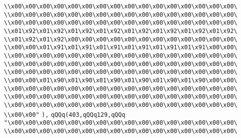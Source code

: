 \verb|\\x00\x00\x00\x00\x00\x00\x00\x00\x00\x00\x00\x00\x00\x00\x00\x00\|\newline
\verb|\\x00\x00\x00\x00\x00\x00\x00\x00\x00\x00\x00\x00\x00\x00\x00\x00\|\newline
\verb|\\x00\x00\x00\x00\x00\x00\x00\x00\x00\x00\x00\x00\x00\x00\x00\x00\|\newline
\verb|\\x01\x92\x01\x92\x01\x92\x01\x92\x01\x92\x01\x92\x01\x92\x01\x92\|\newline
\verb|\\x01\x92\x01\x92\x00\x00\x00\x00\x00\x00\x00\x00\x00\x00\x00\x00\|\newline
\verb|\\x00\x00\x01\x91\x01\x91\x01\x91\x01\x91\x01\x91\x01\x91\x00\x00\|\newline
\verb|\\x00\x00\x00\x00\x00\x00\x00\x00\x00\x00\x00\x00\x00\x00\x00\x00\|\newline
\verb|\\x00\x00\x00\x00\x00\x00\x00\x00\x00\x00\x00\x00\x00\x00\x00\x00\|\newline
\verb|\\x00\x00\x00\x00\x00\x00\x00\x00\x00\x00\x00\x00\x00\x00\x00\x00\|\newline
\verb|\\x00\x00\x01\x90\x01\x90\x01\x90\x01\x90\x01\x90\x01\x90\x00\x00\|\newline
\verb|\\x00\x00\x00\x00\x00\x00\x00\x00\x00\x00\x00\x00\x00\x00\x00\x00\|\newline
\verb|\\x00\x00\x00\x00\x00\x00\x00\x00\x00\x00\x00\x00\x00\x00\x00\x00\|\newline
\verb|\\x00\x00\x00\x00\x00\x00\x00\x00\x00\x00\x00\x00\x00\x00\x00\x00\|\newline
\verb|\\x00\x00"|\newline
\verb|),|\newline
\verb|qQQq(403,qQQq129,qQQq|\newline
\verb|"\x00\x00\x00\x00\x00\x00\x00\x00\x00\x00\x00\x00\x00\x00\x00\x00\|\newline
\verb|\\x00\x00\x00\x00\x00\x00\x00\x00\x00\x00\x00\x00\x00\x00\x00\x00\|\newline
